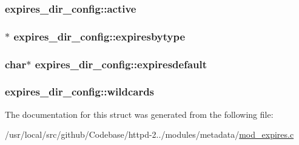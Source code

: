 \subsubsection[{\texorpdfstring{active}{active}}]{ expires\+\_\+dir\+\_\+config\+::active}\hypertarget{structexpires__dir__config_a98c03526d4a7eca3c3c9b03f58810d1b}{}\label{structexpires__dir__config_a98c03526d4a7eca3c3c9b03f58810d1b}
\subsubsection[{\texorpdfstring{expiresbytype}{expiresbytype}}]{$\ast$ expires\+\_\+dir\+\_\+config\+::expiresbytype}\hypertarget{structexpires__dir__config_a7c075cc52083f1561b307c0c5fffcbb6}{}\label{structexpires__dir__config_a7c075cc52083f1561b307c0c5fffcbb6}
\subsubsection[{\texorpdfstring{expiresdefault}{expiresdefault}}]{\setlength{\rightskip}{0pt plus 5cm}char$\ast$ expires\+\_\+dir\+\_\+config\+::expiresdefault}\hypertarget{structexpires__dir__config_a077028bd6f6d4e6736399f00144027c0}{}\label{structexpires__dir__config_a077028bd6f6d4e6736399f00144027c0}
\subsubsection[{\texorpdfstring{wildcards}{wildcards}}]{ expires\+\_\+dir\+\_\+config\+::wildcards}\hypertarget{structexpires__dir__config_ab7eda28f0631757e611bb1a44bbfe0e1}{}\label{structexpires__dir__config_ab7eda28f0631757e611bb1a44bbfe0e1}


The documentation for this struct was generated from the following file\+:\begin{DoxyCompactItemize}
\item 
/usr/local/src/github/\+Codebase/httpd-\/2../modules/metadata/\hyperlink{mod__expires_8c}{mod\+\_\+expires.\+c}\end{DoxyCompactItemize}
